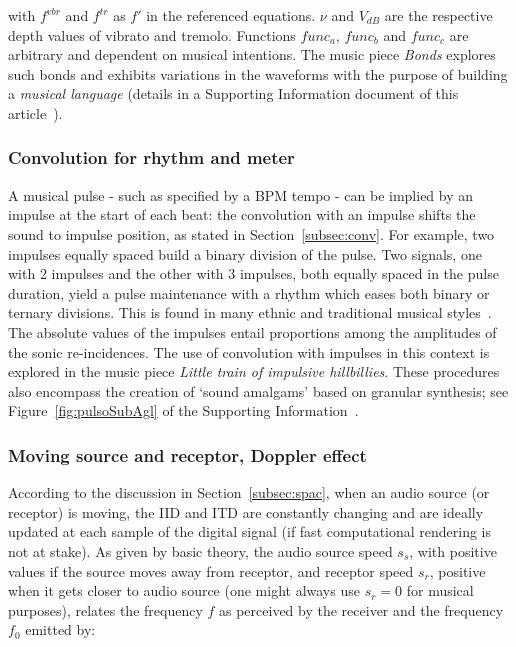 \noindent with $f^{vbr}$ and $f^{tr}$ as $f'$ in the referenced equations.
 $\nu$ and $V_{dB}$ are the respective depth values of vibrato and
tremolo. Functions $func_a$, $func_b$ and $func_c$ are arbitrary and dependent on musical intentions.
The music piece \emph{Bonds} explores such bonds and exhibits variations in the waveforms with the purpose of building a \emph{musical
language} (details in a Supporting Information document of this article~\cite{massNotesInMusic}).~\cite{MASSA}

\subsubsection{Convolution for rhythm and meter}
A musical pulse - such as specified by a BPM
tempo - can be implied by an impulse at the start of each beat: the convolution with an impulse shifts the sound to impulse position, as stated in Section~\ref{subsec:conv}. For example, two impulses equally spaced build a binary division of the
pulse.
Two signals, one with 2 impulses and the other with 3 impulses, both equally spaced in the pulse duration, yield a pulse
maintenance with a rhythm which eases both binary or ternary
divisions.
This is found in many ethnic and traditional musical styles~\cite{Gramani}.
The absolute values of the impulses entail
proportions among the amplitudes of the sonic re-incidences.
The use of convolution with impulses in this context is explored in the music piece \emph{Little train of impulsive hillbillies}.
These procedures also encompass
the creation of `sound amalgams' based on granular synthesis; see Figure~\ref*{fig:pulsoSubAgl} of the Supporting Information~\cite{massNotesInMusic}.~\cite{MASSA}


\subsubsection{Moving source and receptor, Doppler effect}
According to the discussion in Section~\ref{subsec:spac},
when an audio source (or receptor) is moving,
the IID and ITD are constantly changing and
are ideally updated at each sample of the digital signal 
(if fast computational rendering is not at stake).
As given by basic theory,
the audio source speed $s_s$, with positive values if the source moves away from receptor,
and receptor speed $s_r$, positive when it gets closer to audio source (one might always use $s_r=0$ for musical purposes),
relates the frequency $f$ as perceived by the receiver
and the frequency $f_0$ emitted by:

